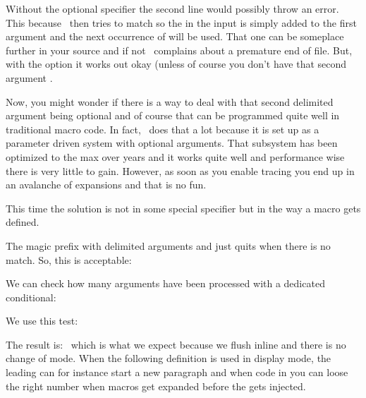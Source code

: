 Without the optional  specifier the second line would
possibly throw an error. This because \TEX\ then tries to match \type{][} so the
\type {] [} in the input is simply added to the first argument and the next
occurrence of \type {][} will be used. That one can be someplace further in your
source and if not \TEX\ complains about a premature end of file. But, with the
\type {#*} option it works out okay (unless of course you don't have that second
argument \type {[2]}.

Now, you might wonder if there is a way to deal with that second delimited
argument being optional and of course that can be programmed quite well in
traditional macro code. In fact, \CONTEXT\ does that a lot because it is set up
as a parameter driven system with optional arguments. That subsystem has been
optimized to the max over years and it works quite well and performance wise
there is very little to gain. However, as soon as you enable tracing you end up
in an avalanche of expansions and that is no fun.

This time the solution is not in some special specifier but in the way a macro
gets defined.

\startbuffer[definition]
\tolerant{}
\stopbuffer

\typebuffer[definition][option=TEX] \getbuffer[definition]

The magic \type {\tolerant} prefix with delimited arguments and just quits when
there is no match. So, this is acceptable:

\startbuffer[example]
\macro [1][2]
\macro [1] [2]
\macro [1]
\macro
\stopbuffer

\typebuffer[example][option=TEX] \getbuffer[example]

We can check how many arguments have been processed with a dedicated conditional:

\startbuffer[definition]
\tolerant{}
\stopbuffer

\typebuffer[definition][option=TEX] \getbuffer[definition]

We use this test:

\startbuffer[example]
\macro [1][2] \macro [1] [2] \macro [1] \macro
\stopbuffer

\typebuffer[example][option=TEX]

The result is: \inlinebuffer[example]\ which is what we expect because we flush
inline and there is no change of mode. When the following definition is used in
display mode, the leading  can for instance start a new paragraph and
when code in \type {\everypar} you can loose the right number when macros get
expanded before the  gets injected.

